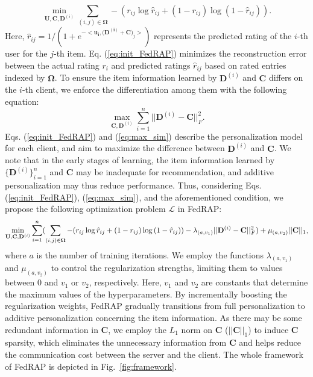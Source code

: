 \documentclass{article} %
\newcommand{\customeqref}[1]{({\ref{#1}})}
\begin{document}
\begin{equation}
    \label{eq:init_FedRAP}
    \min_{\mathbf{U}, \mathbf{C}, \mathbf{D}^{(i)}}
    \sum_{(i, j) \in \mathbf{\Omega}}
     - (r_{ij}\log \hat{r}_{ij}+\left(1-r_{ij}\right)  \log \left(1-\hat{r}_{ij}\right)).
\end{equation}
Here, $\hat{r}_{ij} = 1/(1+e^{-<\mathbf{\mathbf{u}_i, (\mathbf{D}^{(i)} + \mathbf{C}})_j>})$ represents the predicted rating of the $i$-th user for the $j$-th item. Eq. \customeqref{eq:init_FedRAP} minimizes the reconstruction error between the actual rating $r_i$ and predicted ratings $\hat{r}_{ij}$ based on rated entries indexed by $\mathbf{\Omega}$.
To ensure the item information learned by $\mathbf{D}^{(i)}$ and $\mathbf{C}$ differs on the $i$-th client, we enforce the differentiation among them with the following equation:
\begin{equation}
    \label{eq:max_sim}
    \max_{\mathbf{C}, \mathbf{D}^{(i)}}
    \sum_{i=1}^n ||\mathbf{D}^{(i)} - \mathbf{C}||^2_F.
\end{equation}
Eqs. \customeqref{eq:init_FedRAP} and \customeqref{eq:max_sim} describe the personalization model for each client, and aim to maximize the difference between $\mathbf{D}^{(i)}$ and $\mathbf{C}$.
We note that in the early stages of learning, the item information learned by $\{\mathbf{D}^{(i)}\}^n_{i=1}$ and $\mathbf{C}$ may be inadequate for recommendation, and additive personalization may thus reduce performance. 
Thus, considering Eqs. \customeqref{eq:init_FedRAP}, \customeqref{eq:max_sim}, and the aforementioned condition, we propose the following optimization problem $\mathcal{L}$ in FedRAP:
\begin{equation}
    \label{eq:obj}
    \begin{tiny}
        \min_{\mathbf{U}, \mathbf{C}, \mathbf{D}^{(i)}} 
        \sum^{n}_{i=1}
        (
        \sum_{(i, j) \in \mathbf{\Omega}} - (r_{ij}\log \hat{r}_{ij}+\left(1-r_{ij}\right)  \log \left(1-\hat{r}_{ij}\right))
        - \lambda_{(a, v_1)} ||\mathbf{D}^{(i)} - \mathbf{C}||^2_F
        ) 
        + \mu_{(a, v_2)} ||\mathbf{C}||_1,
    \end{tiny}
\end{equation}
where $a$ is the number of training iterations.
We employ the functions $\lambda_{(a, v_1)}$ and $\mu_{(a, v_2)}$ to control the regularization strengths, limiting them to values between 0 and $v_1$ or $v_2$, respectively. Here, $v_1$ and $v_2$ are constants that determine the maximum values of the hyperparameters.
By incrementally boosting the regularization weights, FedRAP gradually transitions from full personalization to additive personalization concerning the item information. 
As there may be some redundant information in $\mathbf{C}$, we employ the $L_1$ norm on $\mathbf{C}$ ($||\mathbf{C}||_1$) to induce $\mathbf{C}$ sparsity, which eliminates the unnecessary information from $\mathbf{C}$ and helps reduce the communication cost between the server and the client.
The whole framework of FedRAP is depicted in Fig.~\ref{fig:framework}.
\end{document}
